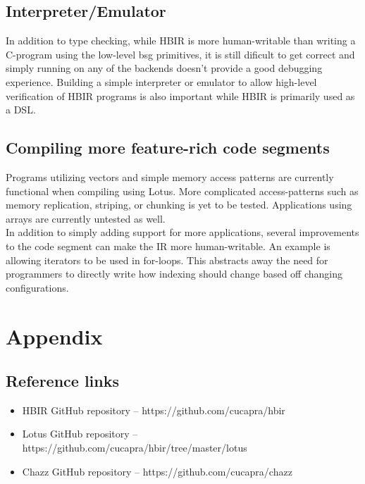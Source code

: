 \documentclass{article}
\begin{document}
\subsection{Interpreter/Emulator}
In addition to type checking, while HBIR is more human-writable than writing a C-program using the low-level bsg primitives, it is still dificult to get correct and simply running on any of the backends doesn't provide a good debugging experience. Building a simple interpreter or emulator to allow high-level verification of HBIR programs is also important while HBIR is primarily used as a DSL.

\subsection{Compiling more feature-rich code segments}
Programs utilizing vectors and simple memory access patterns are currently functional when compiling using Lotus. More complicated access-patterns such as memory replication, striping, or chunking is yet to be tested. Applications using arrays are currently untested as well. \\

In addition to simply adding support for more applications, several improvements to the code segment can make the IR more human-writable. An example is allowing iterators to be used in for-loops. This abstracts away the need for programmers to directly write how indexing should change based off changing configurations. \\

\pagebreak
\section{Appendix}
\subsection{Reference links}\label{ssec:resources}
\begin{itemize}
    \item HBIR GitHub repository -- https://github.com/cucapra/hbir
    \item Lotus GitHub repository -- https://github.com/cucapra/hbir/tree/master/lotus
    \item Chazz GitHub repository -- https://github.com/cucapra/chazz
\end{itemize}
\end{document}
